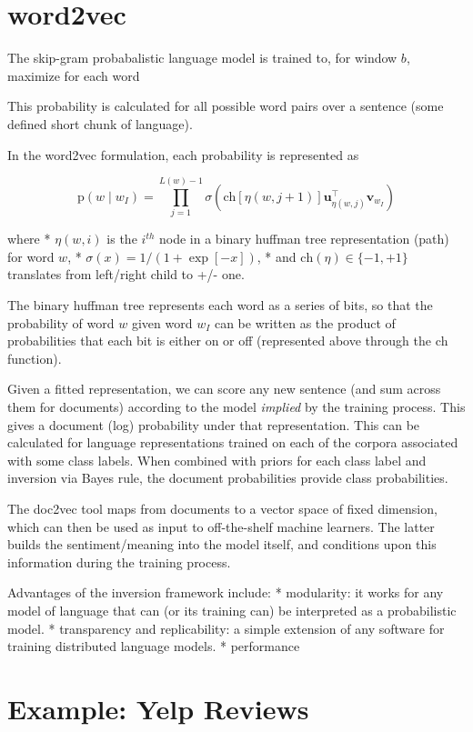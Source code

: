 \documentclass[11pt]{article}
\begin{document}
\section{word2vec}
The skip-gram probabalistic language model is trained to, for window $b$, maximize for each word

This probability is calculated for all possible word pairs over a sentence (some defined short chunk of language).

In the word2vec formulation, each probability is represented as

$$
\mathrm{p}(w \mid w_I) = \prod_{j=1}^{L(w)-1} \sigma\left( \mathrm{ch}\left[\eta(w,j+1)\right] \mathbf{u}_{\eta(w,j)}^\top \mathbf{v}_{w_I} \right)
$$

where 
* $\eta(w,i)$ is the $i^{th}$ node in a binary huffman tree representation (path) for word $w$, 
* $\sigma(x) = 1/(1 + \exp[-x])$,
* and $\mathrm{ch}(\eta) \in \{-1,+1\}$ translates from left/right child to +/- one.

The binary huffman tree represents each word as a series of bits, so that the probability of word $w$ given word $w_I$ can be written as the product of probabilities that each bit is either on or off (represented above through the $\mathrm{ch}$ function).

Given a fitted representation, we can score any new sentence (and sum across them for documents) according to the model \textit{implied} by the training process.  This gives a document (log) probability under that representation.  This can be calculated for language representations trained on each of the corpora associated with some class labels.  When combined with priors for each class label and inversion via Bayes rule, the document probabilities provide class probabilities.

The doc2vec tool maps from documents to a vector space of fixed dimension, which can then be used as input to off-the-shelf machine learners.  The latter builds the sentiment/meaning into the model itself, and conditions upon this information during the training process.

Advantages of the inversion framework include:
* modularity: it works for any model of language that can (or its training can) be interpreted as a probabilistic model.
* transparency and replicability: a simple extension of any software for training distributed language models.
* performance


\section{Example: Yelp Reviews}
\end{document}
